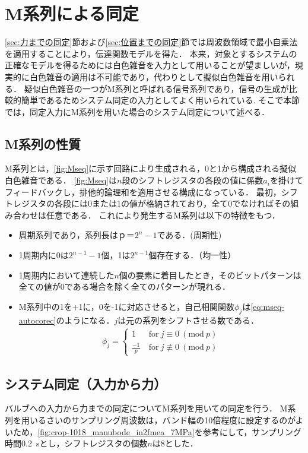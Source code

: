 \section{M系列による同定}
\ref{sec:力までの同定}節および\ref{sec:位置までの同定}節では周波数領域で最小自乗法を適用することにより，伝達関数モデルを得た．
本来，対象とするシステムの正確なモデルを得るためには白色雑音を入力として用いることが望ましいが，現実的に白色雑音の適用は不可能であり，代わりとして擬似白色雑音を用いられる．
疑似白色雑音の一つがM系列と呼ばれる信号系列であり，信号の生成が比較的簡単であるためシステム同定の入力としてよく用いられている\cite{足立200909,柏木濶1998m}.
そこで本節では，同定入力にM系列を用いた場合のシステム同定について述べる．
\subsection{M系列の性質}
M系列とは，\figname\ref{fig:Mseq}に示す回路により生成される，0と1から構成される擬似白色雑音である．
\figname\ref{fig:Mseq}は$n$段のシフトレジスタの各段の値に係数$a_i$を掛けてフィードバックし，排他的論理和を適用させる構成になっている．
最初，シフトレジスタの各段には0または1の値が格納されており，全て0でなければその組み合わせは任意である．
これにより発生するM系列は以下の特徴をもつ\cite{吉谷清澄1971pn,近藤勝也2004m,柏木濶1981m}．
\begin{itemize}
    \item 周期系列であり，系列長は$ｐ＝2^n-1$である．(周期性)
    \item 1周期内に0は$2^{n-1}-1$個，1は$2^{n-1}$個存在する．（均一性）
    \item 1周期内において連続した$n$個の要素に着目したとき，そのビットパターンは全ての値が0である場合を除く全てのパターンが現れる．
    \item M系列中の1を+1に，0を-1に対応させると，自己相関関数$\phi_j$は\eqnname\ref{eq:mseq-autocorec}のようになる．$j$は元の系列をシフトさせる数である．
    \begin{align}
        \label{eq:mseq-autocorec}
        \phi_j = 
        \begin{cases}
            \displaystyle
            1~&\mathrm{for}~j\equiv0~(\mathrm{mod}~p)\\
            \tfrac{-1}{p}~&\mathrm{for}~j\not\equiv0~(\mathrm{mod}~p)
        \end{cases}
    \end{align}
\end{itemize}
\subsection{システム同定（入力から力）}
\label{sec:Mseq_in2force}
バルブへの入力から力までの同定についてM系列を用いての同定を行う．
M系列を用いるさいのサンプリング周波数は，バンド幅の10倍程度に設定するのがよいため\cite{足立200909}，\figname\ref{fig:crop-1018_manubode_in2fmea_7MPa}を参考にして，サンプリング時間\SI{0.2}{s}とし，シフトレジスタの個数$n$は8とした．

